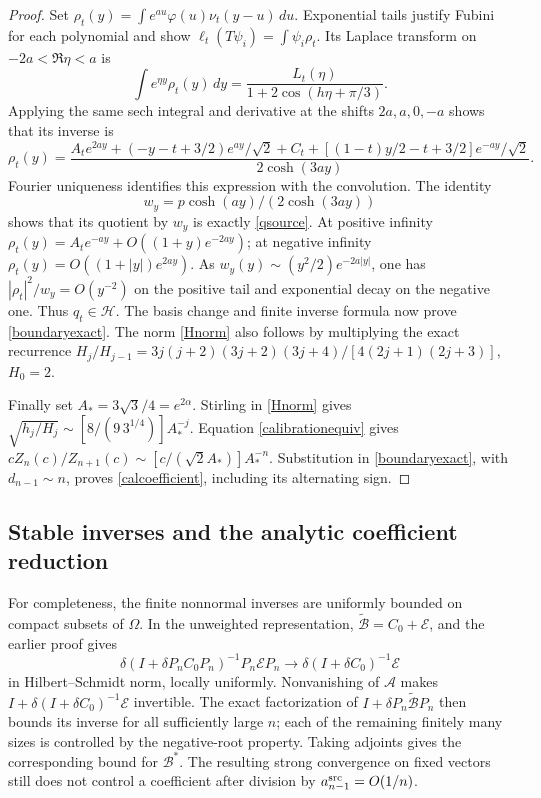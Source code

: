 \begin{proof}
Set
$\rho_t(y)=\int e^{au}\varphi(u)\nu_t(y-u)\,du$.
Exponential tails justify Fubini for each polynomial and show
$\ell_t(T\psi_i)=\int\psi_i\rho_t$.
Its Laplace transform on $-2a<\Re\eta<a$ is
\[
 \int e^{\eta y}\rho_t(y)\,dy
   =\frac{L_t(\eta)}{1+2\cos(h\eta+\pi/3)}.
\]
Applying the same sech integral and derivative at the shifts
$2a,a,0,-a$ shows that its inverse is
\begin{equation}\label{rhosource}
 \rho_t(y)=\frac{A_te^{2ay}+(-y-t+3/2)e^{ay}/\sqrt2+C_t
                +[(1-t)y/2-t+3/2]e^{-ay}/\sqrt2}{2\cosh(3ay)}.
\end{equation}
Fourier uniqueness identifies this expression with the convolution.
The identity
\[w_y=p\cosh(ay)/(2\cosh(3ay))\]
shows that its quotient by $w_y$ is
exactly \eqref{qsource}. At positive infinity
$\rho_t(y)=A_te^{-ay}+O((1+y)e^{-2ay})$; at negative infinity
$\rho_t(y)=O((1+|y|)e^{2ay})$. As
$w_y(y)\sim(y^2/2)e^{-2a|y|}$, one has
$|\rho_t|^2/w_y=O(y^{-2})$ on the positive tail and exponential
decay on the negative one. Thus $q_t\in\mathcal H$.
The basis change and finite inverse formula now prove
\eqref{boundaryexact}. The norm \eqref{Hnorm} also follows by multiplying
the exact recurrence
$H_j/H_{j-1}=3j(j+2)(3j+2)(3j+4)/[4(2j+1)(2j+3)]$, $H_0=2$.

Finally set $A_*=3\sqrt3/4=e^{2\alpha}$. Stirling in \eqref{Hnorm}
gives
$\sqrt{h_j/H_j}\sim [8/(9\,3^{1/4})]A_*^{-j}$.
Equation \eqref{calibrationequiv} gives
$cZ_n(c)/Z_{n+1}(c)\sim[c/(\sqrt2 A_*)]A_*^{-n}$.
Substitution in \eqref{boundaryexact}, with $d_{n-1}\sim n$,
proves \eqref{calcoefficient}, including its alternating sign.
\end{proof}

\subsection{Stable inverses and the analytic coefficient reduction}
For completeness, the finite nonnormal inverses are uniformly bounded
on compact subsets of $\Omega$. In the unweighted representation,
$\widetilde{\mathcal B}=C_0+\mathcal E$, and the earlier proof gives
\[
 \delta(I+\delta P_nC_0P_n)^{-1}P_n\mathcal EP_n
 \longrightarrow\delta(I+\delta C_0)^{-1}\mathcal E
\]
in Hilbert--Schmidt norm, locally uniformly. Nonvanishing of
$\mathcal A$ makes $I+\delta(I+\delta C_0)^{-1}\mathcal E$
invertible. The exact factorization of $I+\delta P_n\widetilde{\mathcal B}P_n$
then bounds its inverse for all sufficiently large $n$; each of the
remaining finitely many sizes is controlled by the negative-root
property. Taking adjoints gives the corresponding bound for
$\mathcal B^*$. The resulting strong convergence on fixed vectors
still does not control a coefficient after division by
$a_{n-1}^{\rm src}=O(1/n)$.

